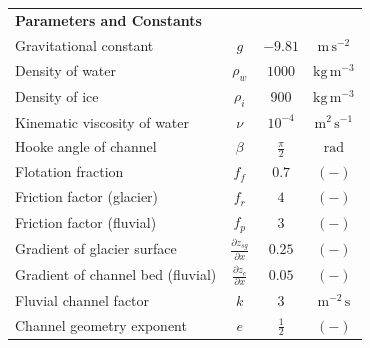 \documentclass[11pt]{article}
\newcommand{\unit}[1]{$\mathrm{#1}$}
\begin{document}
\begin{spacing}{1}
\begin{table}[H]
\begin{tabular}{ l  c  c c }
      \textbf{Parameters and Constants}  & & &\\
      Gravitational constant&$g$& $-9.81$&$\mathrm{m\,s^{-2}}$\\
      Density of water & $\rho_w$& $1000$ & $\mathrm{kg\,m^{-3}}$ \\
      Density of ice & $\rho_i$& $900$ & $\mathrm{kg\,m^{-3}}$ \\
      Kinematic viscosity of water &$\nu$& $10^{-4}$& $\mathrm{m^2\,s^{-1}}$\\
      Hooke angle of channel & $\beta$ & $\frac{\pi}{2}$ & \unit{rad}\\
      Flotation fraction & $f_f$&$0.7$& $\mathrm{(-)}$\\
      Friction factor (glacier) & $f_r$ & $4$ & $\mathrm{(-)}$ \\
      Friction factor (fluvial) & $f_p$ & $3$ & $\mathrm{(-)}$\\
      Gradient of glacier surface & $\frac{\partial z_{sg}}{\partial x}$ &$0.25$& $\mathrm{(-)}$\\
      Gradient of channel bed (fluvial) &$\frac{\partial z_c}{\partial x}$ &$0.05$& $\mathrm{(-)}$\\
      Fluvial channel factor & $k$ &$3$ & $\mathrm{m^{-2}\, s}$\\
      Channel geometry exponent &$e$& $\frac{1}{2}$&$\mathrm{(-)}$ \\
      \hline
    \end{tabular}
    \label{table:vpm}
  \end{table}
  

\end{spacing}
\end{document}
